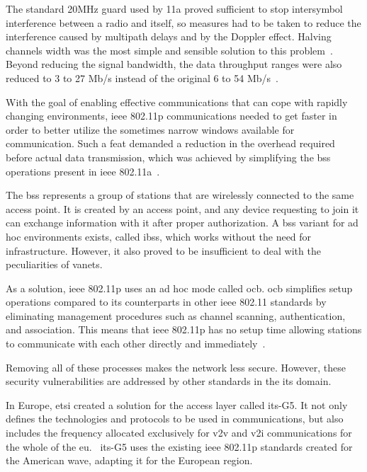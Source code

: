 The standard 20MHz guard used by 11a proved sufficient to stop intersymbol interference between a radio and itself, so measures had to be taken to reduce the interference caused by multipath delays and by the Doppler effect. Halving channels width was the most simple and sensible solution to this problem~\cite{jiang_ieee_2008}. Beyond reducing the signal bandwidth, the data throughput ranges were also reduced to 3 to 27 Mb/s instead of the original 6 to 54 Mb/s~\cite{toor_vehicle_2008}.

With the goal of enabling effective communications that can cope with rapidly changing environments, \gls{ieee} 802.11p communications needed to get faster in order to better utilize the sometimes narrow windows available for communication. Such a feat demanded a reduction in the overhead required before actual data transmission, which was achieved by simplifying the \gls{bss} operations present in \gls{ieee} 802.11a~\cite{jiang_ieee_2008}.

The \gls{bss} represents a group of stations that are wirelessly connected to the same access point. It is created by an access point, and any device requesting to join it can exchange information with it after proper authorization. A \gls{bss} variant for ad hoc environments exists, called \gls{ibss}, which works without the need for infrastructure. However, it also proved to be insufficient to deal with the peculiarities of \glspl{vanet}.

As a solution, \gls{ieee} 802.11p uses an ad hoc mode called \gls{ocb}. \gls{ocb} simplifies setup operations compared to its counterparts in other \gls{ieee} 802.11 standards by eliminating management procedures such as channel scanning, authentication, and association. This means that \gls{ieee} 802.11p has no setup time allowing stations to communicate with each other directly and immediately~\cite{festag_cooperative_2014}.

Removing all of these processes makes the network less secure. However, these security vulnerabilities are addressed by other standards in the \gls{its} domain.

In Europe, \gls{etsi} created a solution for the access layer called \gls{its}-G5. It not only defines the technologies and protocols to be used in communications, but also includes the frequency allocated exclusively for \gls{v2v} and \gls{v2i} communications for the whole of the \gls{eu}.~\cite{asselin-miller_study_2016} \gls{its}-G5 uses the existing \gls{ieee} 802.11p standards created for the American \gls{wave}, adapting it for the European region.


